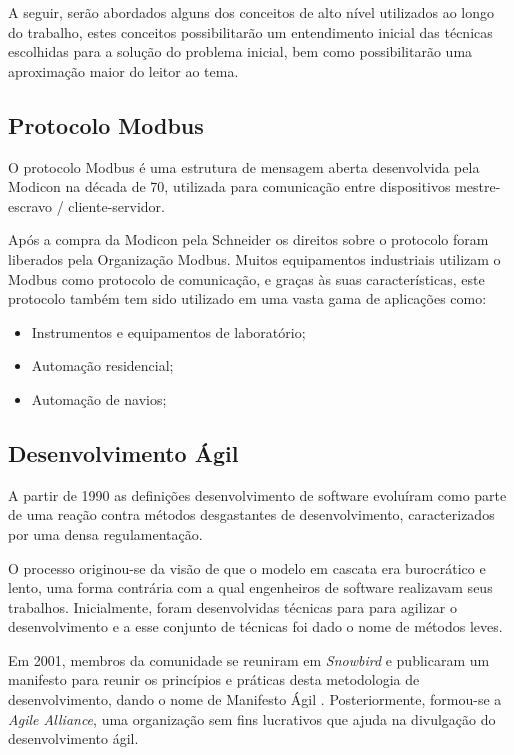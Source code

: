 A seguir, serão abordados alguns dos conceitos de alto nível utilizados ao longo do trabalho, estes conceitos possibilitarão um entendimento inicial das técnicas escolhidas para a solução do problema inicial, bem como possibilitarão uma aproximação maior do leitor ao tema.

\newpage
\subsection{Protocolo Modbus}

O protocolo Modbus é uma estrutura de mensagem aberta desenvolvida pela Modicon na década de 70, utilizada para comunicação entre  dispositivos mestre-escravo / cliente-servidor. \cite{modicon1996}

Após a compra da Modicon pela Schneider os direitos sobre o protocolo foram liberados pela Organização Modbus. Muitos equipamentos industriais utilizam o Modbus como protocolo de comunicação, e graças às suas características, este protocolo também tem sido utilizado em uma vasta gama de aplicações como:

\begin{itemize}
\item  Instrumentos e equipamentos de laboratório;
\item  Automação residencial;
\item  Automação de navios;
\end{itemize}

\subsection{Desenvolvimento Ágil}

A partir de 1990 as definições desenvolvimento de software evoluíram como parte de uma reação contra métodos desgastantes de desenvolvimento, caracterizados por uma densa regulamentação. 

O processo originou-se da visão de que o modelo em cascata era burocrático e lento, uma forma contrária com a qual engenheiros de software realizavam seus trabalhos.
Inicialmente, foram desenvolvidas técnicas para para agilizar o desenvolvimento e a esse conjunto de técnicas foi dado o nome de métodos leves. 

Em 2001, membros da comunidade se reuniram em \textit{Snowbird} e publicaram um manifesto para reunir os princípios e práticas desta metodologia de desenvolvimento, dando o nome de Manifesto Ágil \cite{beck2001manifesto}. Posteriormente, formou-se a \textit{Agile Alliance}, uma organização sem fins lucrativos que ajuda na divulgação do desenvolvimento ágil.

